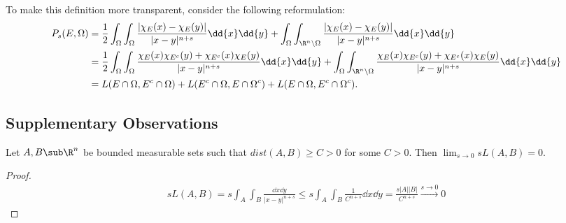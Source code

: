 \documentclass[../main.tex]{subfiles}
\begin{document}
To make this definition more transparent, consider the following reformulation:
\begin{align*}
    P_{s}(E, \Omega) &= \frac{1}{2}\int_{\Omega}\int_{\Omega} \frac{|\chi_{E}(x)-\chi_{E}(y)|}{|x-y|^{n+s}}\dd{x}\dd{y} +  \int_{\Omega}\int_{\R^{n}\setminus \Omega} \frac{| \chi_{E}(x) - \chi_{E}(y)|}{|x-y|^{n+s}}\dd{x}\dd{y} \\
    &= \frac{1}{2}\int_{\Omega}\int_{\Omega} \frac{\chi_{E}(x) \chi_{E^{c}}(y) + \chi_{E^{c}}(x) \chi_{E}(y)}{|x-y|^{n+s}}\dd{x}\dd{y} +  \int_{\Omega}\int_{\R^{n}\setminus \Omega} \frac{\chi_{E}(x) \chi_{E^{c}}(y) + \chi_{E^{c}}(x) \chi_{E}(y)}{|x-y|^{n+s}}\dd{x}\dd{y}\\
    &= L(E\cap \Omega, E^{c} \cap \Omega) + L(E^{c}\cap \Omega, E\cap \Omega^{c}) + L(E\cap \Omega, E^{c}\cap \Omega^{c}).
\end{align*}


\subsection{Supplementary Observations}
\begin{lemma}
    Let $ A, B\sub \R^{n} $ be bounded measurable sets such that $ dist(A,B)\geq C > 0  $ for some $ C>0 $. Then $ \lim_{s\to0} sL(A,B) = 0 $.
\end{lemma}

\begin{proof}
    \begin{align*}
        sL(A,B) = s\int_{A}\int_{B} \frac{\dd{x}\dd{y}}{|x-y|^{n+s}} \leq s\int_{A} \int_{B} \frac{1}{C^{n+s}}\dd{x}\dd{y} = \frac{s |A| |B|}{C^{n+s}} \xrightarrow{s\to0} 0
    \end{align*}
\end{proof}




%
%

%
%

\end{document}
